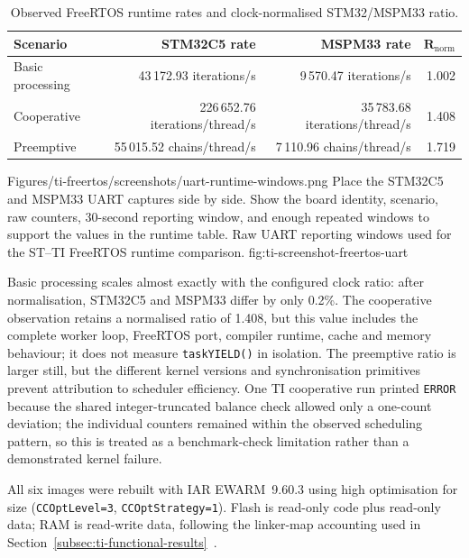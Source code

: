 \begin{table}[H]
\centering
\caption{Observed FreeRTOS runtime rates and clock-normalised STM32/MSPM33 ratio.}
\label{tab:ti-freertos-runtime}
\begin{tabular}{l r r r}
\toprule
\textbf{Scenario} & \textbf{STM32C5 rate} & \textbf{MSPM33 rate} & $\boldsymbol{R_{\mathrm{norm}}}$ \\
\midrule
Basic processing & 43\,172.93 iterations/s & 9\,570.47 iterations/s & 1.002 \\
Cooperative & 226\,652.76 iterations/thread/s & 35\,783.68 iterations/thread/s & 1.408 \\
Preemptive & 55\,015.52 chains/thread/s & 7\,110.96 chains/thread/s & 1.719 \\
\bottomrule
\end{tabular}
\end{table}

\reportscreenshot
      {Figures/ti-freertos/screenshots/uart-runtime-windows.png}
      {Place the STM32C5 and MSPM33 UART captures side by side. Show the board identity, scenario, raw counters, 30-second reporting window, and enough repeated windows to support the values in the runtime table.}
      {Raw UART reporting windows used for the ST--TI FreeRTOS runtime comparison.}
      {fig:ti-screenshot-freertos-uart}

Basic processing scales almost exactly with the configured clock ratio: after normalisation,
STM32C5 and MSPM33 differ by only 0.2\%. The cooperative observation retains a normalised ratio
of 1.408, but this value includes the complete worker loop, FreeRTOS port, compiler runtime,
cache and memory behaviour; it does not measure \texttt{taskYIELD()} in isolation. The
preemptive ratio is larger still, but the different kernel versions and synchronisation
primitives prevent attribution to scheduler efficiency. One TI cooperative run printed
\texttt{ERROR} because the shared integer-truncated balance check allowed only a one-count
deviation; the individual counters remained within the observed scheduling pattern, so this is
treated as a benchmark-check limitation rather than a demonstrated kernel failure.

All six images were rebuilt with IAR EWARM~9.60.3 using high optimisation for size
(\texttt{CCOptLevel=3}, \texttt{CCOptStrategy=1}). Flash is read-only code plus read-only data;
RAM is read-write data, following the linker-map accounting used in
Section~\ref{subsec:ti-functional-results}~\cite{iar-ewarm}.

